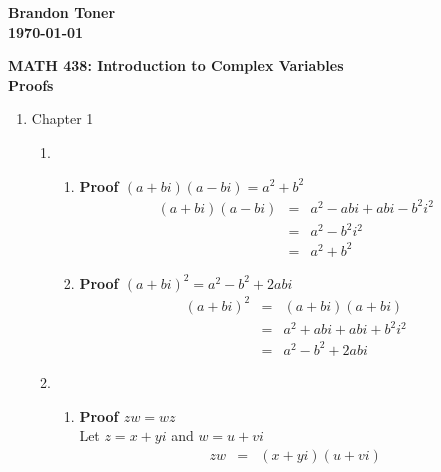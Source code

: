 \documentclass{article}%
\newenvironment{proof}[1][]{\begin{samepage}\textbf{Proof #1} }{\end{samepage}}
\begin{document}
\begin{flushright}
\textbf{Brandon Toner \\
\today}
\end{flushright}

\begin{center}
\textbf{MATH 438: Introduction to Complex Variables \\
Proofs} \\
\end{center}

\begin{enumerate}
    \item Chapter 1
    \begin{enumerate}[label*=\arabic*.]
        \item 
        \begin{enumerate}[label=\alph*]
            \item 
            \begin{proof}[$(a+bi)(a-bi)=a^2 + b^2$]
                \begin{eqnarray*}
                    (a+bi)(a-bi)&=& a^2 - abi + abi - b^2i^2 \\
                                &=& a^2 - b^2 i^2            \\
                                &=& a^2 + b^2
                \end{eqnarray*}
            \end{proof}
            \item
            \begin{proof}[$(a+bi)^2=a^2 - b^2 + 2abi$]
                \begin{eqnarray*}
                    (a+bi)^2 &=& (a+bi)(a+bi)              \\
                             &=& a^2 + abi + abi + b^2 i^2 \\
                             &=& a^2 - b^2 + 2abi
                \end{eqnarray*}
            \end{proof}
        \end{enumerate}
        \item
    	\begin{enumerate}[label=\alph*]
            \item
            \begin{proof}[$zw=wz$]
                \\ Let $z=x+yi$ and $w=u+vi$
                \begin{eqnarray*}
                    zw&=&(x+yi)(u+vi) \\

\end{eqnarray*}
\end{proof}
\end{enumerate}
\end{enumerate}
\end{enumerate}
\end{document}
